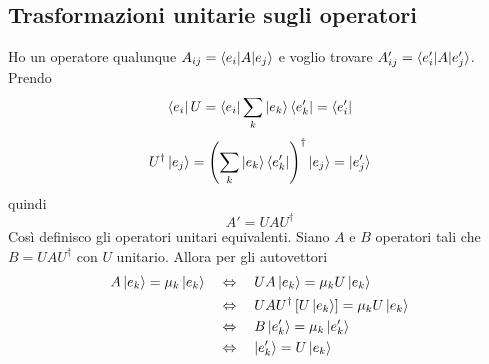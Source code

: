 \subsection{Trasformazioni unitarie sugli operatori}
Ho un operatore qualunque \(A_{ij} = \braket{e_i|A|e_j}\) e voglio trovare
\(A_{ij}' = \braket{e_i'|A|e_j'}\). Prendo
\[
  \bra{e_i} U = \bra{e_i} \sum_k \ket{e_k} \bra{e_k'} = \bra{e_i'}
\]
\[
  U^\dag \ket{e_j}
  = \left( \sum_k \ket{e_k} \bra{e_k'} \right)^\dag \ket{e_j}
  = \ket{e_j'}
\]
quindi
\[
  A' = U A U^\dag
\]
Così definisco gli operatori unitari equivalenti. Siano \(A\) e \(B\) operatori
tali che \(B = U A U^\dag\) con \(U\) unitario. Allora per gli autovettori
\begin{align*}
  A \ket{e_k} = \mu_k \ket{e_k} \quad
  &\Leftrightarrow \quad U A \ket{e_k} = \mu_k U \ket{e_k} \\
  &\Leftrightarrow \quad U A U^\dag \left[ U \ket{e_k} \right]
    = \mu_k U \ket{e_k} \\
  &\Leftrightarrow \quad B \ket{e_k'} = \mu_k \ket{e_k'} \\
  &\Leftrightarrow \quad \ket{e_k'} = U \ket{e_k}
\end{align*}